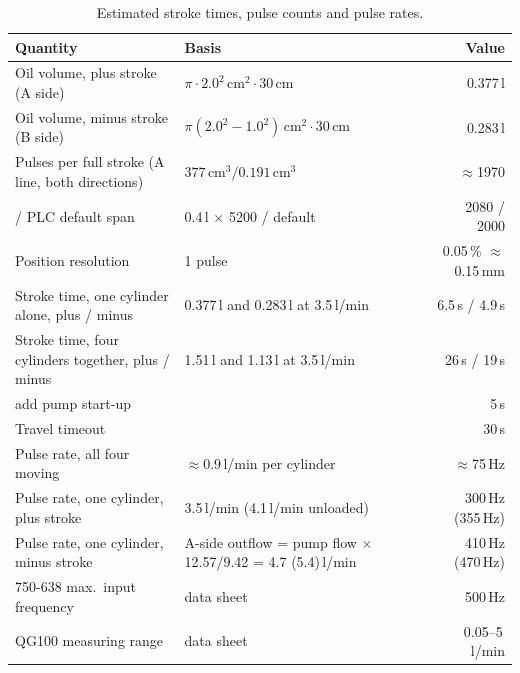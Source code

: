 \documentclass[11pt,a4paper]{article}
\begin{document}
\begin{table}[htbp]
\centering
\caption{Estimated stroke times, pulse counts and pulse rates.}
\label{tab:calc}
\begin{small}
\begin{tabularx}{\textwidth}{@{}LP{50mm}r@{}}
\toprule
Quantity & Basis & Value \\
\midrule
Oil volume, plus stroke (A side) & $\pi\cdot 2.0^2\,\text{cm}^2 \cdot 30\,\text{cm}$ & 0.377\,l \\
Oil volume, minus stroke (B side) & $\pi(2.0^2-1.0^2)\,\text{cm}^2 \cdot 30\,\text{cm}$ & 0.283\,l \\
Pulses per full stroke (A line, both directions) & $377\,\text{cm}^3 / 0.191\,\text{cm}^3$ & $\approx$1970 \\
\quad [FD] / PLC default span & 0.4\,l $\times$ 5200 / default  & 2080 / 2000 \\
Position resolution & 1 pulse & 0.05\,\% $\approx$ 0.15\,mm \\
Stroke time, one cylinder alone, plus / minus & 0.377\,l and 0.283\,l at 3.5\,l/min & 6.5\,s / 4.9\,s \\
Stroke time, four cylinders together, plus / minus & 1.51\,l and 1.13\,l at 3.5\,l/min & 26\,s / 19\,s \\
\quad add pump start-up &  & 5\,s \\
Travel timeout &  & 30\,s \\
Pulse rate, all four moving & $\approx$0.9\,l/min per cylinder & $\approx$75\,Hz \\
Pulse rate, one cylinder, plus stroke & 3.5\,l/min (4.1\,l/min unloaded) & 300\,Hz (355\,Hz) \\
Pulse rate, one cylinder, minus stroke & A-side outflow = pump flow $\times$ 12.57/9.42 = 4.7 (5.4)\,l/min & 410\,Hz (470\,Hz) \\
750-638 max.\ input frequency & data sheet & 500\,Hz \\
QG100 measuring range & data sheet & 0.05--5\,l/min \\
\bottomrule
\end{tabularx}
\end{small}
\end{table}
\end{document}

